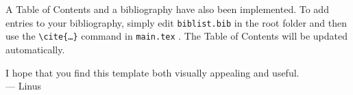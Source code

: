 \documentclass[12pt]{article}
\begin{document}
	A Table of Contents and a bibliography have also been implemented. To add entries to your bibliography, simply edit \texttt{biblist.bib} in the root folder and then use the \texttt{\textbackslash cite\{\ldots\}} command in \texttt{main.tex} \cite{bibtex}. The Table of Contents will be updated automatically.
	
	I hope that you find this template both visually appealing and useful. \\
	
	\hspace{1 cm}--- Linus
	
	\newpage
	
	
	
\end{document}

